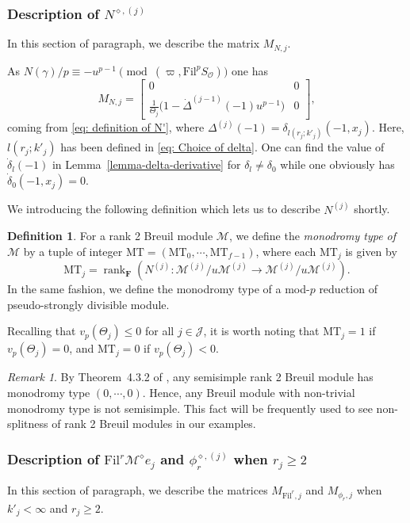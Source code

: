 \documentclass[11pt]{amsart}
\theoremstyle{definition}
\numberwithin{equation}{subsection}
\theoremstyle{plain}
\theoremstyle{plain}
\theoremstyle{plain}
\theoremstyle{plain}
\theoremstyle{plain}
\theoremstyle{plain}
\theoremstyle{plain}
\theoremstyle{plain}
\theoremstyle{plain}
\theoremstyle{plain}
\theoremstyle{plain}
\theoremstyle{plain}
\theoremstyle{definition}
\newtheorem{defi}[equation]{Definition}
\theoremstyle{definition}
\theoremstyle{definition}
\theoremstyle{remark}
\newtheorem{rema}[equation]{Remark}
\renewcommand{\(}{\textup{(}}
\renewcommand{\)}{\textup{)}}
\newcommand{\F}{\mathbf{F}}
\newcommand{\cM}{\mathcal{M}}
\newcommand{\Fil}{\mathrm{Fil}}
\newcommand{\cO}{\mathcal{O}}
\newcommand{\cJ}{\mathcal{J}}
\begin{document}
\subsubsection{\textbf{Description of $N^{\diamond,(j)}$}}
In this section of paragraph, we describe the matrix $M_{N,j}$.

As $N(\gamma)/p\equiv -u^{p-1} \pmod{(\varpi,\Fil^p S_{\cO})}$ one has
$$M_{N,j}=
\begin{bmatrix}
  0 & 0 \\
  \frac{1}{\Theta_j}\big(1-\dot\Delta^{(j-1)}(-1)u^{p-1}\big) & 0
\end{bmatrix},$$
coming from \eqref{eq: definition of N'}, where $\Delta^{(j)}(-1)=\delta_{l(r_j;k'_j)}(-1,x_j)$. Here, $l(r_j;k'_j)$ has been defined in \eqref{eq: Choice of delta}. One can find the value of $\dot\delta_{l}(-1)$ in Lemma~\ref{lemma-delta-derivative} for $\delta_l\neq\delta_0$ while one obviously has $\dot\delta_0(-1,x_j)=0$.

We introducing the following definition which lets us to describe $N^{(j)}$ shortly.
\begin{defi}\label{defi: monodromy type}
For a rank 2 Breuil module $\cM$, we define the \textit{monodromy type of $\cM$} by a tuple of integer $\mathrm{MT}=(\mathrm{MT}_0,\cdots,\mathrm{MT}_{f-1})$, where each $\mathrm{MT}_j$ is given by
    $$\mathrm{MT}_j=\operatorname{rank}_{\F}(N^{(j)}:\cM^{(j)}/u\cM^{(j)}\to\cM^{(j)}/u\cM^{(j)}).$$
In the same fashion, we define the monodromy type of a mod-$p$ reduction of pseudo-strongly divisible module.
\end{defi}

Recalling that $v_p(\Theta_j)\leq 0$ for all $j\in\cJ$, it is worth noting that $\mathrm{MT}_j=1$ if $v_p(\Theta_j)=0$, and $\mathrm{MT}_j=0$ if $v_p(\Theta_j)<0$.

\begin{rema}
By Theorem~4.3.2 of \cite{Caruso}, any semisimple rank 2 Breuil module has monodromy type $(0,\cdots,0)$. Hence, any Breuil module with non-trivial monodromy type is not semisimple. This fact will be frequently used to see non-splitness of rank 2 Breuil modules in our examples.
\end{rema}


\subsubsection{\textbf{Description of $\Fil^r\cM^\diamond e_j$ and $\phi_r^{\diamond,(j)}$ when $r_j\geq 2$}}
In this section of paragraph, we describe the matrices $M_{\Fil^r,j}$ and $M_{\phi_r,j}$ when $k'_j<\infty$ and $r_j\geq 2$.
\end{document}
